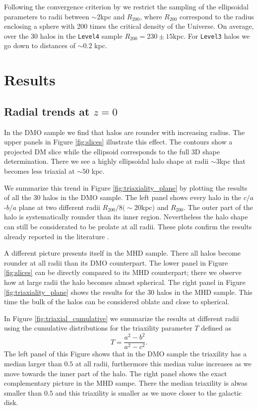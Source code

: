 \documentclass[a4paper,fleqn,usenatbib]{mnras}
\begin{document}
Following the convergence criterion by \cite{Vera-Crito_et_al.2011} we
restrict the sampling of the ellipsoidal parameters to radii  between
$\sim 2$kpc and $R_{200}$, where  $R_{200}$ correspond to the  radius
enclosing a sphere with 200 times the critical density of the Universe.
On average, over the 30 halos in the \texttt{Level4} sample
$R_{200}=230\pm 15$kpc. 
For \texttt{Level3} halos we go down to distances of $\sim 0.2$ kpc.  

\section{Results}

\subsection{Radial trends at $z=0$}

In the DMO sample we find that halos are rounder with increasing
radius.
The upper panels in Figure \ref{fig:slices} illustrate this effect.
The contours show a projected DM slice while the ellipsoid corresponds
to the full 3D shape determination. 
There we see a highly ellipsoidal halo shape at radii $\sim 3$kpc
that becomes less triaxial at $\sim 50$ kpc.

We summarize this trend in Figure \ref{fig:triaxiality_plane} by
plotting the results of all the 30 halos in the DMO sample.
The left panel shows every halo in the $c/a$-$b/a$ plane at
two different radii $R_{200}/8 (\sim 20$kpc$)$ and $R_{200}$. 
The outer part of the halo is systematically rounder than its inner
region. 
Nevertheless the halo shape can still be considerated to be prolate at
all radii. 
These plots confirm the results already reported in the
literature \citep{VeraCiro11}.

A different picture presents itself in the MHD sample.
There all halos become rounder at all radii than its DMO
counterpart.
The lower panel in Figure \ref{fig:slices} can be directly compared to
its MHD counterpart; there we observe how at large radii the halo
becomes almost spherical. 
The right panel in Figure \ref{fig:triaxiality_plane} shows the
results for the 30 halos in the MHD sample.
This time the bulk of the halos can be considered oblate and close to
spherical. 

In Figure \ref{fig:triaxial_cumulative} we summarize the results at
different radii using the cumulative distributions for the 
triaxility parameter $T$ defined as 
\begin{equation}
T=\frac{a^2-b^2}{a^2-c^2}.
\label{eq:triaxiality}
\end{equation}
The left panel of this Figure shows that in the DMO sample the
triaxility has a median larger than $0.5$ at all radii, furthermore
this median value increases as we move towards the inner part of the
halo.
The right panel shows the exact complementary picture in the MHD
sampe.
There the median triaxility is alwas smaller than $0.5$ and this
triaxility is smaller as we move closer to the galactic disk.
\end{document}
